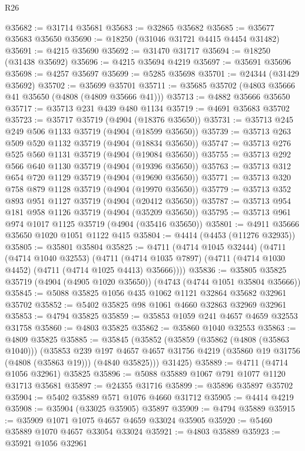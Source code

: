 \begin{lexlean}{R26}
\begin{coremodule}
@35682 := @31714 @35681
@35683 := @32865 @35682
@35685 := @35677 @35683 @35650
@35690 := @18250 (@31046 @31721 @4415 @4454 @31482)
@35691 := @4215 @35690
@35692 := @31470 @31717
@35694 := @18250 (@31438 @35692)
@35696 := @4215 @35694 @4219
@35697 := @35691 @35696
@35698 := @4257 @35697
@35699 := @5285 @35698
@35701 := @24344 (@31429 @35692)
@35702 := @35699 @35701
@35711 := @35685 @35702 (@4803 @35666 @41 @35650 (@4808 (@4809 @35666 @41)))
@35713 := @4882 @35666 @35650
@35717 := @35713 @231 @439 @480 @1134
@35719 := @4691 @35683 @35702
@35723 := @35717 @35719 (@4904 (@18376 @35650))
@35731 := @35713 @245 @249 @506 @1133 @35719 (@4904 (@18599 @35650))
@35739 := @35713 @263 @509 @520 @1132 @35719 (@4904 (@18834 @35650))
@35747 := @35713 @276 @525 @560 @1131 @35719 (@4904 (@19084 @35650))
@35755 := @35713 @292 @566 @640 @1130 @35719 (@4904 (@19396 @35650))
@35763 := @35713 @312 @654 @720 @1129 @35719 (@4904 (@19690 @35650))
@35771 := @35713 @320 @758 @879 @1128 @35719 (@4904 (@19970 @35650))
@35779 := @35713 @352 @893 @951 @1127 @35719 (@4904 (@20412 @35650))
@35787 := @35713 @954 @181 @958 @1126 @35719 (@4904 (@35209 @35650))
@35795 := @35713 @961 @974 @1017 @1125 @35719 (@4904 (@35416 @35650))
@35801 := @4911 @35666 @35650 @1020 @1051 @1122 @415
@35804 := @4414 (@4453 (@11276 @32935))
@35805 := @35801 @35804
@35825 := @4711
    (@4714 @1045 @32444)
    (@4711
      (@4714 @1040 @32553)
      (@4711 (@4714 @1035 @7897) (@4711 (@4714 @1030 @4452) (@4711 (@4714 @1025 @4413) @35666))))
@35836 := @35805 @35825 @35719 (@4904 (@4905 @1020 @35650)) (@4743 (@4744 @1051 @35804 @35666))
@35845 := @5088 @35825 @1056 @435 @1062 @1121 @32864 @35682 @32961 @35702
@35852 := @5402 @35825 @98 @1061 @4660 @32863 @32969 @32961
@35853 := @4794 @35825
@35859 := @35853 @1059 @241 @4657 @4659 @32553 @31758
@35860 := @4803 @35825
@35862 := @35860 @1040 @32553
@35863 := @4809 @35825
@35885 := @35845
    (@35852
      (@35859
        (@35862 (@4808 (@35863 @1040)))
        (@35853
          @239
          @197
          @4657
          @4657
          @31756
          @4219
          (@35860 @19 @31756 (@4808 (@35863 @19)))
          (@4840 @35825)))
      @31425)
@35889 := @4711 (@4714 @1056 @32961) @35825
@35896 := @5088 @35889 @1067 @791 @1077 @1120 @31713 @35681
@35897 := @24355 @31716
@35899 := @35896 @35897 @35702
@35904 := @5402 @35889 @571 @1076 @4660 @31712
@35905 := @4414 @4219
@35908 := @35904 (@33025 @35905) @35897
@35909 := @4794 @35889
@35915 := @35909 @1071 @1075 @4657 @4659 @33024 @35905
@35920 := @5460 @35889 @1070 @4657 @33054 @33024
@35921 := @4803 @35889
@35923 := @35921 @1056 @32961

\end{coremodule}
\end{lexlean}
